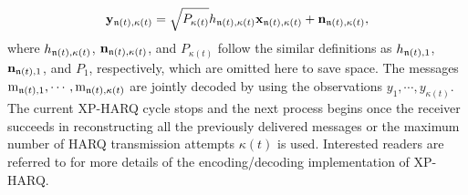 \documentclass[lettersize,journal]{IEEEtran}
\begin{document}
\begin{equation}\label{eqn:receive signal 1}
\mathbf{y}_{\frak{n}(t),\kappa(t)}=\sqrt{P_{\kappa(t)}} h_{\frak{n}(t),\kappa(t)} \mathbf{x}_{\frak{n}(t),\kappa(t)}+\mathbf{n}_{\frak{n}(t),\kappa(t)},
\end{equation}
where $h_{\frak{n}(t),\kappa(t)}$, ${\bf n}_{\frak{n}(t),\kappa(t)}$, and $P_{\kappa(t)}$ follow the similar definitions as $h_{\frak{n}(t),1}$, ${\bf n}_{\frak{n}(t),1}$, and $P_1$, respectively, which are omitted here to save space. The messages ${\rm m}_{\frak{n}(t),1},\cdots,{\rm m}_{\frak{n}(t),\kappa(t)}$ are jointly decoded by using the observations ${y_{1}}, \cdots,{y_{\kappa(t)}}$. The current XP-HARQ cycle stops and the next process begins once the receiver succeeds in reconstructing all the previously delivered messages or the maximum number of HARQ transmission attempts ${\kappa(t)}$ is used. Interested readers are referred to \cite{7878518} for more details of the encoding/decoding implementation of XP-HARQ.






\end{document}
